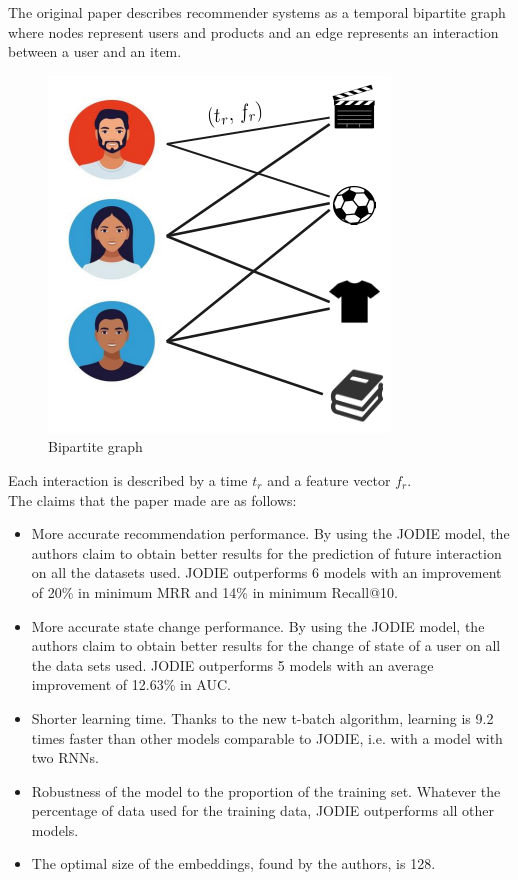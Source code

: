 The original paper describes recommender systems as a temporal bipartite graph where nodes represent users and products and an edge represents an interaction between a user and an item. 

\begin{figure}[H]
    \centering
    \includegraphics[scale = 0.4]{image/bipartite_graph.png}
    \caption{Bipartite graph}
\end{figure}

Each interaction is described by a time $t_r$ and a feature vector $f_r$.\\



The claims that the paper made are as follows:
\begin{itemize}
    \item More accurate recommendation performance. By using the JODIE model, the authors claim to obtain better results for the prediction of future interaction on all the datasets used. JODIE outperforms 6 models with an improvement of 20\% in minimum MRR and 14\% in minimum Recall@10.
    \item More accurate state change performance. By using the JODIE model, the authors claim to obtain better results for the change of state of a user on all the data sets used. JODIE outperforms 5 models with an average improvement of 12.63\% in AUC.
    \item Shorter learning time. Thanks to the new t-batch algorithm, learning is 9.2 times faster than other models comparable to JODIE, i.e. with a model with two RNNs.
    \item Robustness of the model to the proportion of the training set. Whatever the percentage of data used for the training data, JODIE outperforms all other models.
    \item The optimal size of the embeddings, found by the authors, is 128.
\end{itemize}

